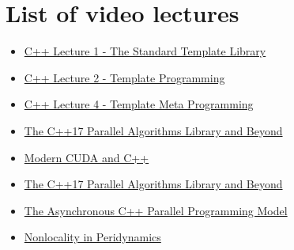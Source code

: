 \documentclass[11pt,fleqn]{book} %
\begin{document}

\cleardoublepage %
{}
\lstlistoflistings


\cleardoublepage %
{}
\listoffigures


\chapter*{List of video lectures}


\begin{itemize}
\item \href{https://www.youtube.com/watch?v=asGZTCR53KY&list=PL7vEgTL3FalY2eBxud1wsfz8OKvE9sd_z}{C++ Lecture 1 - The Standard Template Library}
\item \href{https://www.youtube.com/watch?v=iU3wsiJ5mts}{C++ Lecture 2 - Template Programming }
\item \href{https://www.youtube.com/watch?v=6PWUByLZO0g}{C++ Lecture 4 - Template Meta Programming}
\item \href{https://www.youtube.com/watch?v=Vck6kzWjY88}{The C++17 Parallel Algorithms Library and
Beyond}
\item \href{https://youtu.be/5vr7ItjyIH8}{Modern CUDA and C++}
\item \href{https://www.youtube.com/watch?v=Vck6kzWjY88}{The C++17 Parallel Algorithms Library and
Beyond}
\item \href{https://www.youtube.com/watch?v=js-e8xAMd1s}{The Asynchronous C++ Parallel Programming Model}
\item \href{https://www.youtube.com/watch?v=_Uv-_K3KTek&t=32s}{Nonlocality in Peridynamics}
\end{itemize}
\end{document}
